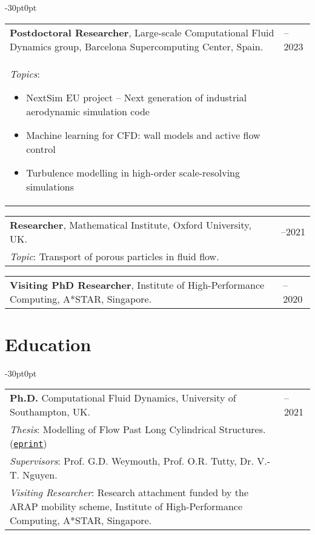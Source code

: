 \documentclass[line]{res}
\newenvironment{p1}
{\begin{adjustwidth}{-30pt}{0pt}
\vspace{8pt}}
{\end{adjustwidth}}
\begin{document}
\begin{resume}
\begin{p1}
\vspace{-5pt}
\begin{tabular}{p{} >{\raggedleft\arraybackslash}p{}}
	\textbf{Postdoctoral Researcher}, Large-scale Computational Fluid Dynamics group, Barcelona Supercomputing Center, Spain. & 2021--2023 \\
	\textit{Topics}:
	\begin{itemize}
		\item NextSim EU project -- Next generation of industrial aerodynamic simulation code
		\item Machine learning for CFD: wall models and active flow control
		\item Turbulence modelling in high-order scale-resolving simulations
	\end{itemize}
\end{tabular}

\vspace{-5pt}
\begin{tabular}{p{} >{\raggedleft\arraybackslash}p{}}
	\textbf{Researcher}, Mathematical Institute, Oxford University, UK.& 2020--2021 \\
\textit{Topic}: Transport of porous particles in fluid flow. & \\
\end{tabular}

\vspace{5pt}
\begin{tabular}{p{} >{\raggedleft\arraybackslash}p{}}
	\textbf{Visiting PhD Researcher}, Institute of High-Performance Computing, A*STAR, Singapore. & 2017--2020 \\
\end{tabular}
\end{p1}

\section{Education}

\begin{p1}
\begin{tabular}{p{} >{\raggedleft\arraybackslash}p{}}
	\textbf{Ph.D.} Computational Fluid Dynamics, University of Southampton, UK. & 2015--2021 \\
	\textit{Thesis}: Modelling of Flow Past Long Cylindrical Structures. (\href{https://b-fg.github.io/assets/pdf/Font_2020_PhD_Modelling_of_Flow_Past_Long_Cylindrical_Structures.pdf}{\texttt{eprint}}) & \\
	\textit{Supervisors}: Prof. G.D. Weymouth, Prof. O.R. Tutty, Dr. V.-T. Nguyen. & \\
	\textit{Visiting Researcher}: Research attachment funded by the ARAP mobility scheme, Institute of High-Performance Computing, A*STAR, Singapore. & \\
\end{tabular}


\end{p1}
\end{resume}
\end{document}
